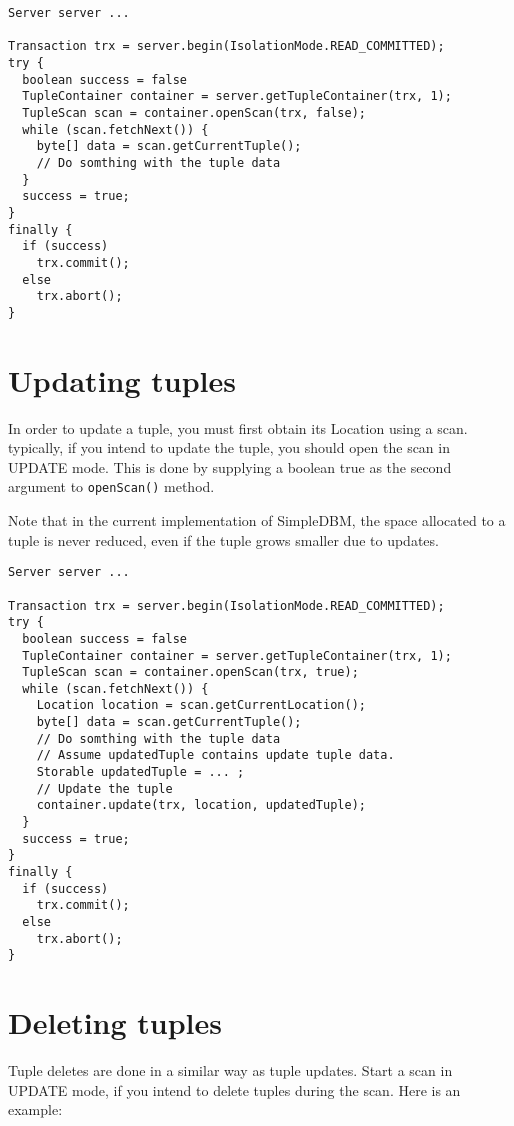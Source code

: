 \documentclass[a4paper,draft,oneside]{book}
\begin{document}
\begin{verbatim}
Server server ...

Transaction trx = server.begin(IsolationMode.READ_COMMITTED);
try {
  boolean success = false      
  TupleContainer container = server.getTupleContainer(trx, 1);
  TupleScan scan = container.openScan(trx, false);
  while (scan.fetchNext()) {
    byte[] data = scan.getCurrentTuple();
    // Do somthing with the tuple data
  }
  success = true;
}
finally {
  if (success)
    trx.commit();
  else
    trx.abort();
}
\end{verbatim}


\section{Updating tuples}

In order to update a tuple, you must first obtain its Location using a
scan. typically, if you intend to update the tuple, you should open the
scan in UPDATE mode. This is done by supplying a boolean true as the
second argument to \verb|openScan()| method.

Note that in the current implementation of SimpleDBM, the space
allocated to a tuple is never reduced, even if the tuple grows smaller
due to updates.

\begin{verbatim}
Server server ...

Transaction trx = server.begin(IsolationMode.READ_COMMITTED);
try {
  boolean success = false      
  TupleContainer container = server.getTupleContainer(trx, 1);
  TupleScan scan = container.openScan(trx, true);
  while (scan.fetchNext()) {
    Location location = scan.getCurrentLocation();
    byte[] data = scan.getCurrentTuple();
    // Do somthing with the tuple data
    // Assume updatedTuple contains update tuple data.
    Storable updatedTuple = ... ;
    // Update the tuple
    container.update(trx, location, updatedTuple);
  }
  success = true;
}
finally {
  if (success)
    trx.commit();
  else
    trx.abort();
}
\end{verbatim}

\section{Deleting tuples}

Tuple deletes are done in a similar way as tuple updates.
Start a scan in UPDATE mode, if you intend to delete tuples
during the scan. Here is an example:
\end{document}
